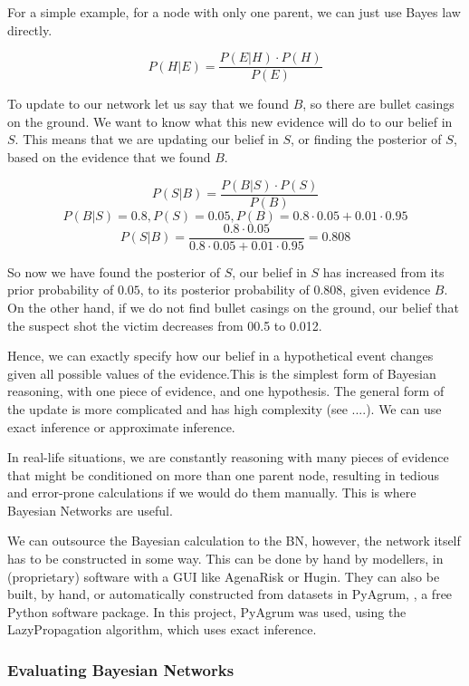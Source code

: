 \documentclass[12pt]{article}
\begin{document}
For a simple example, for a node with only one parent, we can just use Bayes law directly.


\[ P(H | E) =  \frac{P(E | H) \cdot P(H)}{P(E)}\]




To update to our network let us say that we found $B$, so there are bullet casings on the ground. We want to know what this new evidence will do to our belief in $S$. This means that we are updating our belief in $S$, or finding the posterior of $S$, based on the evidence that we found $B$.

\[ P(S | B) =  \frac{P(B | S) \cdot P(S)}{P(B)}\]
\[ P(B | S) = 0.8, P(S) = 0.05, P(B) = 0.8 \cdot 0.05 + 0.01 \cdot 0.95\]
\[ P(S | B) =  \frac{0.8 \cdot 0.05}{0.8 \cdot 0.05 + 0.01 \cdot 0.95} = 0.808\]

So now we have found the posterior of $S$, our belief in $S$ has increased from its prior probability of $0.05$, to its posterior probability of $0.808$, given evidence $B$. On the other hand, if we do not find bullet casings on the ground, our belief that the suspect shot the victim decreases from 00.5 to 0.012. 


Hence, we can exactly specify how our belief in a hypothetical event changes given all possible values of the evidence.This is the simplest form of Bayesian reasoning, with one piece of evidence, and one hypothesis. The general form of the update is more complicated and has high complexity (see ....). We can use exact inference or approximate inference.


In real-life situations, we are constantly reasoning with many pieces of evidence that might be conditioned on more than one parent node, resulting in tedious and error-prone calculations if we would do them manually. This is where Bayesian Networks are useful. 



We can outsource the Bayesian calculation to the BN, however, the network itself has to be constructed in some way. This can be done by hand by modellers, in (proprietary) software with a GUI like AgenaRisk or Hugin. They can also be built, by hand, or automatically constructed from datasets in PyAgrum, \citep{pyagrum2020}, a free Python software package. In this project, PyAgrum was used, using the LazyPropagation algorithm, which uses exact inference.



\subsubsection{Evaluating Bayesian Networks}
\end{document}

